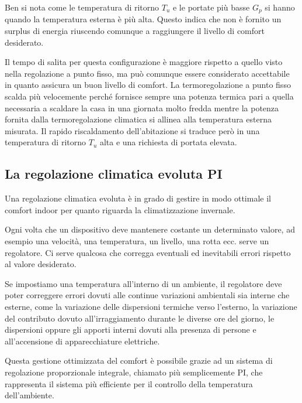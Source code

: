 \documentclass[laurea,oneside,11pt]{USiena_tesiLM3}
\begin{document}
Ben si nota come le temperatura di ritorno $T_u$ e le portate più basse  $G_p$ si hanno quando la temperatura esterna è più alta. Questo indica che non è fornito un surplus di energia riuscendo comunque a raggiungere il livello di comfort desiderato.

Il tempo di salita per questa configurazione è maggiore rispetto a quello visto nella regolazione a punto fisso, ma può comunque essere considerato accettabile in quanto assicura un buon livello di comfort. La termoregolazione a punto fisso scalda più velocemente perché fornisce sempre una potenza termica pari a quella necessaria a scaldare la casa in una giornata molto fredda mentre la potenza fornita dalla termoregolazione climatica si allinea alla temperatura esterna misurata. Il rapido riscaldamento dell'abitazione si traduce però in una temperatura di ritorno $T_u$ alta e una richiesta di portata elevata. 

\subsection{La regolazione climatica evoluta PI}
Una regolazione climatica evoluta è in grado di gestire in modo ottimale il comfort indoor per quanto riguarda la climatizzazione invernale.

Ogni volta che un dispositivo deve mantenere costante un determinato valore, ad esempio una velocità, una temperatura, un livello, una rotta ecc. serve un regolatore. Ci serve qualcosa che corregga eventuali ed inevitabili errori rispetto al valore desiderato.
 
Se impostiamo una temperatura all'interno di un ambiente, il regolatore deve poter correggere errori dovuti alle continue variazioni ambientali sia interne che esterne, come la variazione delle dispersioni termiche verso l'esterno, la variazione del contributo dovuto all'irraggiamento durante le diverse ore del giorno, le dispersioni oppure gli apporti interni dovuti alla presenza di persone e all'accensione di apparecchiature elettriche.

Questa gestione ottimizzata  del comfort è possibile grazie ad un sistema di regolazione proporzionale integrale, chiamato più semplicemente PI, che rappresenta il sistema più efficiente per il controllo della temperatura dell'ambiente. 
\end{document}

